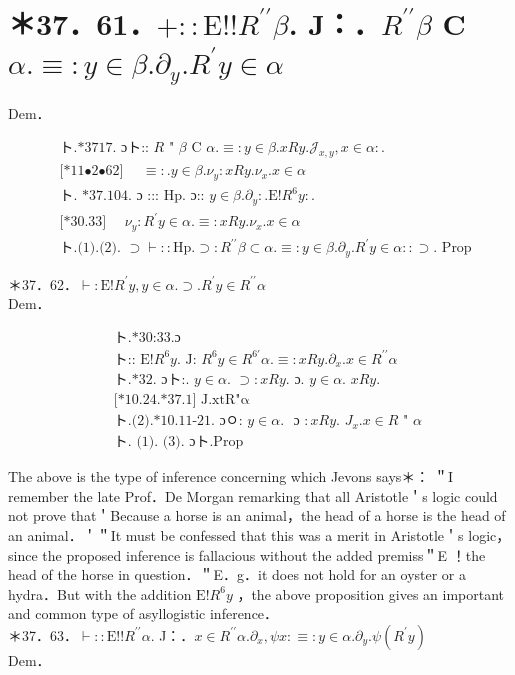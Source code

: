 \documentclass[10pt]{article}
\begin{document}
\section*{＊37．61．$+:: \mathrm{E}!!R^{\prime \prime} \beta$. J：．$R^{\prime \prime} \beta$ C $\alpha . \equiv: y \in \beta . \partial_{y} . R^{\prime} y \in \alpha$}
Dem．


\begin{align*}
& \text { ト.*3717. ɔト:: } R \text { " } \beta \text { C } \alpha . \equiv: y \in \beta . x R y . \mathcal{J}_{x, y}, x \in \alpha: . \\
& \text { [*11•2•62] } \quad \equiv: . y \in \beta . \nu_{y}: x R y . \nu_{x} . x \in \alpha  \tag{1}\\
& \text { ト. *37.104. ɔ ::: Hp. ɔ:: } y \in \beta . \partial_{y}: . \mathrm{E}!R^{6} y: . \\
& \text { [*30.33] } \quad \nu_{y}: R^{\prime} y \in \alpha . \equiv: x R y . \nu_{x} . x \in \alpha  \tag{2}\\
& \text { ト.(1).(2). } \supset \vdash:: \mathrm{Hp} . \supset: R^{\prime \prime} \beta \subset \alpha . \equiv: y \in \beta . \partial_{y} . R^{\prime} y \in \alpha:: \supset \text {. Prop }
\end{align*}


＊37．62．$\vdash: \mathrm{E}!R^{\prime} y, y \in \alpha . \supset . R^{\prime} y \in R^{\prime \prime} \alpha$\\
Dem．


\begin{align*}
& \text { ト.*30:33.ɔ } \\
& \text { ト:: } \mathrm{E}!R^{6} y . \text { J: } R^{6} y \in R^{6 \prime} \alpha . \equiv: x R y . \partial_{x} . x \in R^{\prime \prime} \alpha  \tag{1}\\
& \text { ト.*32. ɔト:. } y \in \alpha \text {. } \supset: x R y \text {. ɔ. } y \in \alpha \text {. } x R y \text {. } \\
& \text { [*10.24.*37.1] J.xtR"α }  \tag{2}\\
& \text { ト.(2).*10.11-21. ɔㅇ: } y \in \alpha \text {. } \text { ɔ }: x R y \text {. } J_{x} . x \in R \text { " } \alpha  \tag{3}\\
& \text { ト. (1). (3). ɔト.Prop }
\end{align*}


The above is the type of inference concerning which Jevons says＊： ＂I remember the late Prof．De Morgan remarking that all Aristotle＇s logic could not prove that＇Because a horse is an animal，the head of a horse is the head of an animal．＇＂It must be confessed that this was a merit in Aristotle＇s logic，since the proposed inference is fallacious without the added premiss＂E ！the head of the horse in question．＂E．g．it does not hold for an oyster or a hydra．But with the addition $\mathrm{E}!R^{6} y$ ，the above proposition gives an important and common type of asyllogistic inference．\\
＊37．63．$\vdash:: \mathrm{E}!!R^{\prime \prime} \alpha$. J：．$x \in R^{\prime \prime} \alpha . \partial_{x}, \psi x: \equiv: y \in \alpha . \partial_{y} . \psi\left(R^{\prime} y\right)$\\
Dem．
\end{document}
